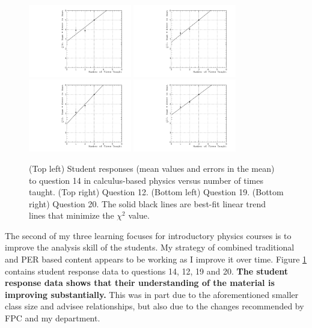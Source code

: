 \documentclass[../../main.tex]{subfiles}
\begin{document}
\begin{figure}
\centering
\includegraphics[width=0.4\textwidth]{Q14_calculus_based.pdf}
\includegraphics[width=0.4\textwidth]{Q12_calculus_based.pdf}
\includegraphics[width=0.4\textwidth]{Q19_calculus_based.pdf}
\includegraphics[width=0.4\textwidth]{Q20_calculus_based.pdf}
\caption{\label{fig:courses:intro_q14_2}  (Top left) Student responses (mean values and errors in the mean) to question 14 in calculus-based physics versus number of times taught.  (Top right) Question 12. (Bottom left) Question 19. (Bottom right) Question 20.  The solid black lines are best-fit linear trend lines that minimize the $\chi^2$ value.}
\end{figure}

The second of my three learning focuses for introductory physics courses is to improve the analysis skill of the students.  My strategy of combined traditional and PER based content appears to be working as I improve it over time.  Figure \ref{fig:courses:intro_q14_2} contains student response data to questions 14, 12, 19 and 20.  \textbf{The student response data shows that their understanding of the material is improving substantially.}  This was in part due to the aforementioned smaller class size and advisee relationships, but also due to the changes recommended by FPC and my department. \\ \hspace{0.1cm}
\end{document}
